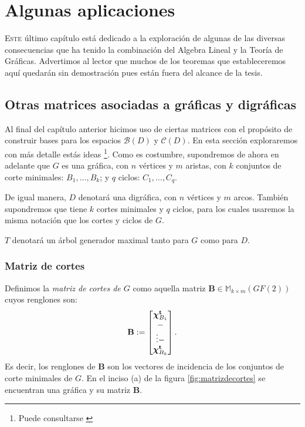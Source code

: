 \chapter{Algunas aplicaciones}

\lettrine [lines=5] {\initfamily \selectfont E} {ste} último capítulo está dedicado a la exploración de algunas de las diversas consecuencias que ha tenido la combinación del Algebra Lineal y la Teoría de Gráficas. Advertimos al lector que muchos de los teoremas que estableceremos aquí quedarán sin demostración pues están fuera del alcance de la tesis. 


\section{Otras matrices asociadas a gráficas y digráficas}
Al final del capítulo anterior hicimos uso de ciertas matrices con el propósito de construir bases para los espacios $\mathcal{B}(D)$ y $\mathcal{C}(D)$. En esta sección exploraremos con más detalle estás ideas \footnote{Puede consultarse \cite{Deo,Seshu,Gross}}. Como es costumbre, supondremos de ahora en adelante que $G$ es una gráfica, con $n$ vértices y $m$ aristas, con $k$ conjuntos de corte minimales: $B_{1}, \ldots, B_{k}$; y $q$ ciclos: $C_{1},\ldots, C_{q}$.

De igual manera, $D$ denotará una digráfica, con $n$ vértices y $m$ arcos. También supondremos que tiene $k$ cortes minimales y $q$ ciclos, para los cuales usaremos la misma notación que los cortes y ciclos de $G$.

$T$ denotará un árbol generador maximal tanto para $G$ como para $D$.

\subsection{Matriz de cortes}
Definimos la \textit{matriz de cortes de $G$} como aquella matriz $\mathbf{B} \in \mathbb{M}_{k \times m}(GF(2))$ cuyos renglones son:
$$
\mathbf{B}:= \begin{bmatrix} 
\boldsymbol{\chi}_{B_{1}}^{\mathbf{t}} \\
\-- \\
\vdots
\-- \\
\boldsymbol{\chi}_{B_{k}}^{\mathbf{t}}
\end{bmatrix}.
$$
 Es decir, los renglones de $\mathbf{B}$ son los vectores de incidencia de los conjuntos de corte minimales de $G$. En el inciso (a) de la figura \ref{fig:matrizdecortes} se encuentran una gráfica y su matriz $\mathbf{B}$.
 
